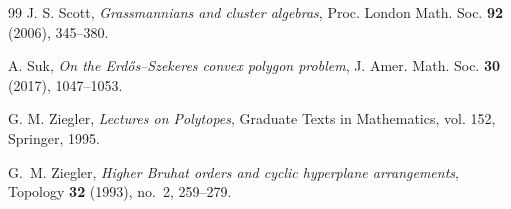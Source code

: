 \documentclass[11pt]{article}
\begin{document}
\begin{thebibliography}{99}
 J. S. Scott, \emph{Grassmannians and cluster algebras}, Proc. London Math. Soc. \textbf{92} (2006), 345--380.

A. Suk,
\emph{On the Erd\H{o}s--Szekeres convex polygon problem},
J. Amer. Math. Soc. \textbf{30} (2017), 1047--1053.

G. M. Ziegler,
\emph{Lectures on Polytopes},
Graduate Texts in Mathematics, vol. 152, Springer, 1995.


G.~M. Ziegler, \emph{Higher Bruhat orders and cyclic hyperplane arrangements}, Topology \textbf{32} (1993), no.~2, 259--279.

\end{thebibliography}
\end{document}
